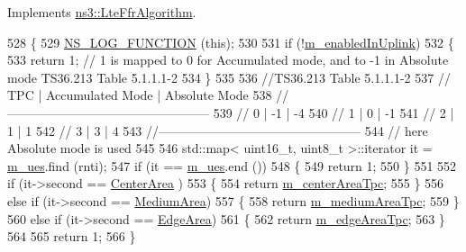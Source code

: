 Implements \hyperlink{classns3_1_1LteFfrAlgorithm_a1c58dea37b4812fcb2a817e3e1c45343}{ns3\+::\+Lte\+Ffr\+Algorithm}.


\begin{DoxyCode}
528 \{
529   \hyperlink{log-macros-disabled_8h_a90b90d5bad1f39cb1b64923ea94c0761}{NS\_LOG\_FUNCTION} (\textcolor{keyword}{this});
530 
531   \textcolor{keywordflow}{if} (!\hyperlink{classns3_1_1LteFfrAlgorithm_a6c681821267dfedf7083600005db4bee}{m\_enabledInUplink})
532     \{
533       \textcolor{keywordflow}{return} 1;     \textcolor{comment}{// 1 is mapped to 0 for Accumulated mode, and to -1 in Absolute mode TS36.213 Table
       5.1.1.1-2}
534     \}
535 
536   \textcolor{comment}{//TS36.213 Table 5.1.1.1-2}
537   \textcolor{comment}{//   TPC   |   Accumulated Mode  |  Absolute Mode}
538   \textcolor{comment}{//------------------------------------------------}
539   \textcolor{comment}{//    0    |         -1          |      -4}
540   \textcolor{comment}{//    1    |          0          |      -1}
541   \textcolor{comment}{//    2    |          1          |       1}
542   \textcolor{comment}{//    3    |          3          |       4}
543   \textcolor{comment}{//------------------------------------------------}
544   \textcolor{comment}{// here Absolute mode is used}
545 
546   std::map< uint16\_t, uint8\_t >::iterator it = \hyperlink{classns3_1_1LteFfrSoftAlgorithm_ad91e051d77e6fda38a1429ac2dd0fc3b}{m\_ues}.find (rnti);
547   \textcolor{keywordflow}{if} (it == \hyperlink{classns3_1_1LteFfrSoftAlgorithm_ad91e051d77e6fda38a1429ac2dd0fc3b}{m\_ues}.end ())
548     \{
549       \textcolor{keywordflow}{return} 1;
550     \}
551 
552   \textcolor{keywordflow}{if} (it->second == \hyperlink{classns3_1_1LteFfrSoftAlgorithm_ab7465e8060d14e4f9e298b06c9ba372ca6b2efef259a1214094469a40ee394d9d}{CenterArea} )
553     \{
554       \textcolor{keywordflow}{return} \hyperlink{classns3_1_1LteFfrSoftAlgorithm_a2603343b6e59edefa75a47b40f1d2122}{m\_centerAreaTpc};
555     \}
556   \textcolor{keywordflow}{else} \textcolor{keywordflow}{if} (it->second == \hyperlink{classns3_1_1LteFfrSoftAlgorithm_ab7465e8060d14e4f9e298b06c9ba372ca72dc112f24d8d2424039109b8d3e71a6}{MediumArea})
557     \{
558       \textcolor{keywordflow}{return} \hyperlink{classns3_1_1LteFfrSoftAlgorithm_a6e77e31e179ddde74613832daf3ca87b}{m\_mediumAreaTpc};
559     \}
560   \textcolor{keywordflow}{else} \textcolor{keywordflow}{if} (it->second == \hyperlink{classns3_1_1LteFfrSoftAlgorithm_ab7465e8060d14e4f9e298b06c9ba372caf9e9c75f49991f8ac90d74756884c9f5}{EdgeArea})
561     \{
562       \textcolor{keywordflow}{return} \hyperlink{classns3_1_1LteFfrSoftAlgorithm_aeec11300e4db685b334e594e009d20fd}{m\_edgeAreaTpc};
563     \}
564 
565   \textcolor{keywordflow}{return} 1;
566 \}
\end{DoxyCode}
